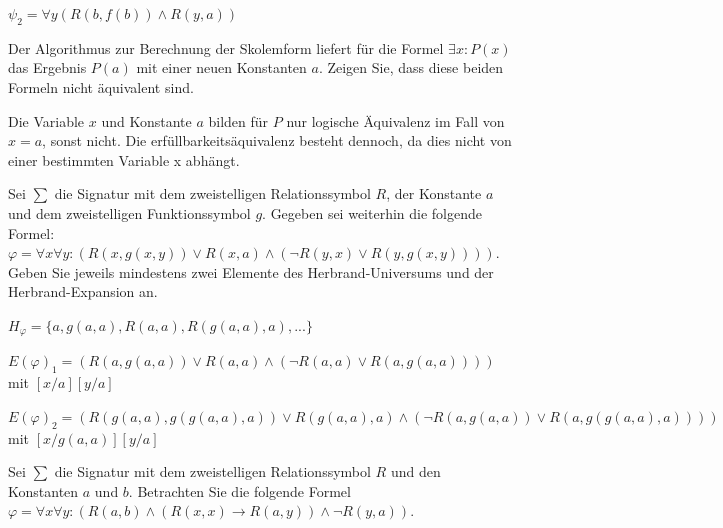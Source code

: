 \documentclass[10pt, a4paper]{exam}
\begin{document}
\begin{questions}
\begin{parts}
\begin{solution}
            $\psi_2 = \forall y ( R(b, f(b)) \wedge R(y, a))$
        \end{solution}
    \end{parts}

    \question Der Algorithmus zur Berechnung der Skolemform liefert für die Formel $\exists x:P(x)$ das Ergebnis $P(a)$ mit einer neuen Konstanten $a$. Zeigen Sie, dass diese beiden Formeln nicht äquivalent sind.
    \begin{solution}
        Die Variable $x$ und Konstante $a$ bilden für $P$ nur logische Äquivalenz im Fall von $x=a$, sonst nicht. Die erfüllbarkeitsäquivalenz besteht dennoch, da dies nicht von einer bestimmten Variable x abhängt.
    \end{solution}

    \question Sei $\sum$ die Signatur mit dem zweistelligen Relationssymbol $R$, der Konstante $a$ und dem zweistelligen Funktionssymbol $g$. Gegeben sei weiterhin die folgende Formel:
    $\varphi=\forall x\forall y:(R(x,g(x,y))\vee R(x,a)\wedge(\lnot R(y,x)\vee R(y,g(x,y))))$.
    Geben Sie jeweils mindestens zwei Elemente des Herbrand-Universums und der Herbrand-Expansion an.
    \begin{solution}
        $H_{\varphi} = \{a, g(a,a), R(a,a), R(g(a,a),a), ...\}$

        $E(\varphi)_1 =  (R(a,g(a,a))\vee R(a,a)\wedge(\lnot R(a,a)\vee R(a,g(a,a))))$ mit $[x/a][y/a]$

        $E(\varphi)_2 =  (R(g(a,a),g(g(a,a),a))\vee R(g(a,a),a)\wedge(\lnot R(a,g(a,a))\vee R(a,g(g(a,a),a))))$ mit $[x/g(a,a)][y/a]$
    \end{solution}

    \question Sei $\sum$ die Signatur mit dem zweistelligen Relationssymbol $R$ und den Konstanten $a$ und $b$. Betrachten Sie die folgende Formel $\varphi=\forall x\forall y:(R(a,b)\wedge(R(x,x)\rightarrow R(a,y))\wedge\lnot R(y,a))$.
\end{questions}
\end{document}
